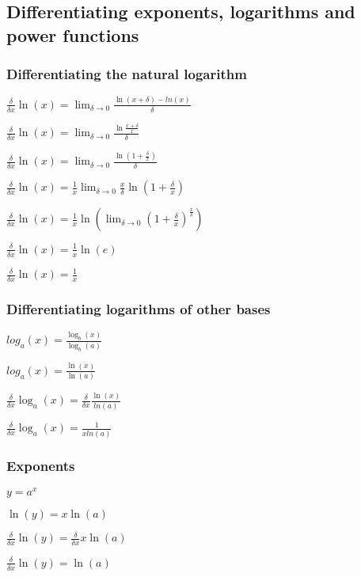 
\subsection{Differentiating exponents, logarithms and power functions}

\subsubsection{Differentiating the natural logarithm}

\(\frac{\delta }{\delta x}\ln (x)=\lim_{\delta \rightarrow 0}\frac{\ln(x+\delta)-ln(x)}{\delta }\)

\(\frac{\delta }{\delta x}\ln (x)=\lim_{\delta \rightarrow 0}\frac{\ln\frac{x+\delta}{x}}{\delta }\)

\(\frac{\delta }{\delta x}\ln (x)=\lim_{\delta \rightarrow 0}\frac{\ln(1+\frac{\delta}{x})}{\delta }\)

\(\frac{\delta }{\delta x}\ln (x)=\frac{1}{x}\lim_{\delta \rightarrow 0}\frac{x}{\delta}\ln(1+\frac{\delta}{x})\)

\(\frac{\delta }{\delta x}\ln (x)=\frac{1}{x}\ln(\lim_{\delta \rightarrow 0}(1+\frac{\delta}{x})^{\frac{x}{\delta }})\)

\(\frac{\delta }{\delta x}\ln (x)=\frac{1}{x}\ln(e)\)

\(\frac{\delta }{\delta x}\ln (x)=\frac{1}{x}\)

\subsubsection{Differentiating logarithms of other bases}

\(log_a(x)=\frac{\log_b(x)}{\log_b(a)}\)

\(log_a(x)=\frac{\ln(x)}{\ln(a)}\)

\(\frac{\delta }{\delta x}\log_a(x)=\frac{\delta }{\delta x}\frac{\ln(x)}{ln(a)}\)

\(\frac{\delta }{\delta x}\log_a(x)=\frac{1}{xln(a)}\)

\subsubsection{Exponents}

$y=a^x$

$\ln(y)=x\ln(a)$

$\frac{\delta }{\delta x}\ln(y)=\frac{\delta }{\delta x}x\ln(a)$

$\frac{\delta }{\delta x}\ln(y)=\ln(a)$

